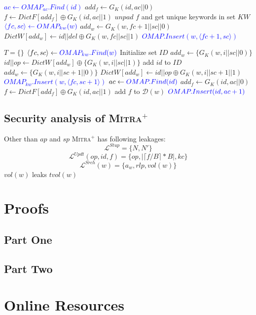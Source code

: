 \documentclass[sigconf]{acmart}
\newcommand{\pair}[2]{{\langle \ensuremath{#1, #2} \rangle}}
\newcommand{\DB}[1]{\mathcal{D}(#1)}
\newcommand{\vol}[1]{\lvert{#1}\rvert}
\newcommand{\ceil}[1]{\lceil #1 \rceil}
\newcommand{\Mitrap}{\textsc{Mitra}$^{+}$ }
\newcommand{\tblue}[1]{\textcolor{blue}{#1}}
\begin{document}
\begin{algorithm}[tbh]
\caption{\Mitrap $(K,\sigma';EDB')$ $\leftrightarrow$ $Delete(K,op,\pair{id}{\bot},\sigma;EDB)$}\label{mitrap:delete}
\begin{algorithmic}[1]
\State \tblue{$ac \gets OMAP_{ac}.Find(id)$}
\State $add_f \gets G_K(id,ac||0)$
\State $f \gets DictF[add_f] \oplus G_K(id,ac||1)$
\State $unpad$ $f$ and get unique keywords in set $KW$
\State $\tblue{\pair{fc}{sc} \gets OMAP_{kw}(w)}$
\State $add_w \gets G_K(w,fc+1||sc||0)$
\State $DictW[add_w] \gets id||del \oplus G_K(w,fc||sc||1)$
\State \tblue{$OMAP.Insert(w,\pair{fc+1}{sc})$}
\EndFor
\end{algorithmic}
\end{algorithm}
\label{Algo:Mitra+Delete}



\begin{algorithm}[H]
\caption{\Mitrap $\DB{w}$ $\leftrightarrow$ Search($K$,$w$,$\sigma$;$EDB$)}\label{mitra:search}
\begin{algorithmic}[1]
\State $T = \{ \}$
\State $\pair{fc}{sc} \gets \tblue{OMAP_{kw}.Find(w)}$
\State Initialize set $ID$
  \State $add_w \gets \{G_K(w,i||sc||0)\}$
  \State $id||op \gets DictW[add_w] \oplus  \{G_K(w,i||sc||1)\}$
   add $id$ to $ID$
  \EndIf
  \State $add_w \gets \{G_K(w,i||sc+1||0)\}$
  \State $DictW[add_w] \gets id||op \oplus G_K(w,i||sc+1||1)$
  \State \tblue{$OMAP_{kw}.Insert(w,\pair{fc}{sc+1})$}
\EndFor
{}
\State $ac \gets \tblue{OMAP.Find(id)}$
\State $add_f \gets G_K(id,ac||0)$
\State $f \gets DictF[add_f] \oplus G_K(id,ac||1) $
\State add $f$ to $\DB{w}$
\State $\tblue{OMAP.Insert(id,ac+1)}$
\EndFor
\end{algorithmic}
\end{algorithm}
\label{Algo:Mitra+Search}


\subsection{Security analysis of \Mitrap}
Other than $ap$ and $sp$ \Mitrap has following leakages:
$$\mathcal{L}^{Stup} = \{N,N'\}$$
$$\mathcal{L}^{Updt}(op,id,f) = \{op,\vol{\ceil{f/B}*B},kc\}$$
$$\mathcal{L}^{Srch}(w) = 
\{a_w,rlp,vol(w)\}$$
$vol(w)$ leaks $tvol(w)$
\section{Proofs}

\subsection{Part One}


\subsection{Part Two}


\section{Online Resources}
\end{document}
